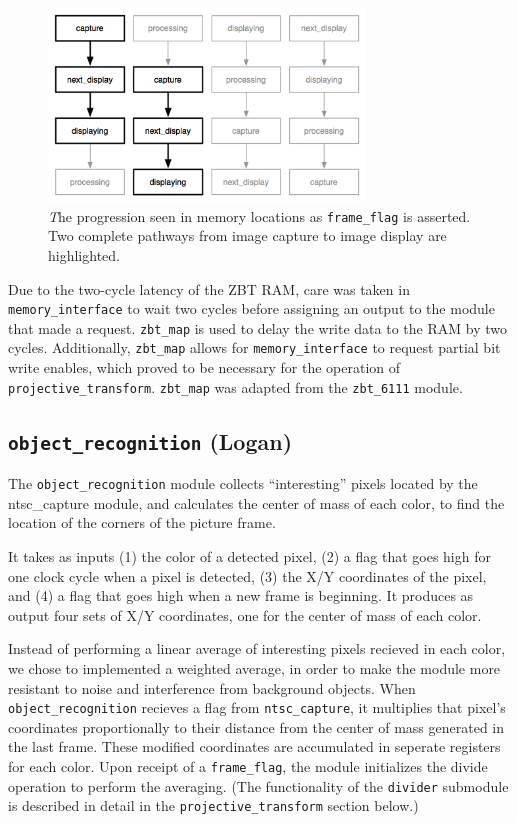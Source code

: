 \documentclass[10pt]{article}
\begin{document}
\begin{figure}[h!]
\centering
\includegraphics[width=0.75\textwidth]{images/buffers.png}
\caption{{\emph The progression seen in memory locations as {\tt frame\_flag} is asserted. Two complete pathways from image capture to image display are highlighted.}}
\end{figure}

Due to the two-cycle latency of the ZBT RAM, care was taken in {\tt memory\_interface} to wait two cycles before assigning an output to the module that made a request. {\tt zbt\_map} is used to delay the write data to the RAM by two cycles. Additionally, {\tt zbt\_map} allows for {\tt memory\_interface} to request partial bit write enables, which proved to be necessary for the operation of {\tt projective\_transform}. {\tt zbt\_map} was adapted from the {\tt zbt\_6111} module.

\subsection{{\tt object\_recognition} (Logan)}
The {\tt object\_recognition} module collects ``interesting'' pixels located by the {ntsc\_capture} module, and calculates the center of mass of each color, to find the location of the corners of the picture frame.

It takes as inputs (1) the color of a detected pixel, (2) a flag that goes high for one clock cycle when a pixel is detected, (3) the X/Y coordinates of the pixel, and (4) a flag that goes high when a new frame is beginning. It produces as output four sets of X/Y coordinates, one for the center of mass of each color.

Instead of performing a linear average of interesting pixels recieved in each color, we chose to implemented a weighted average, in order to make the module more resistant to noise and interference from background objects. When {\tt object\_recognition} recieves a flag from {\tt ntsc\_capture}, it multiplies that pixel's coordinates proportionally to their distance from the center of mass generated in the last frame. These modified coordinates are accumulated in seperate registers for each color. Upon receipt of a {\tt frame\_flag}, the module initializes the divide operation to perform the averaging. (The functionality of the {\tt divider} submodule is described in detail in the {\tt projective\_transform} section below.)
\end{document}
